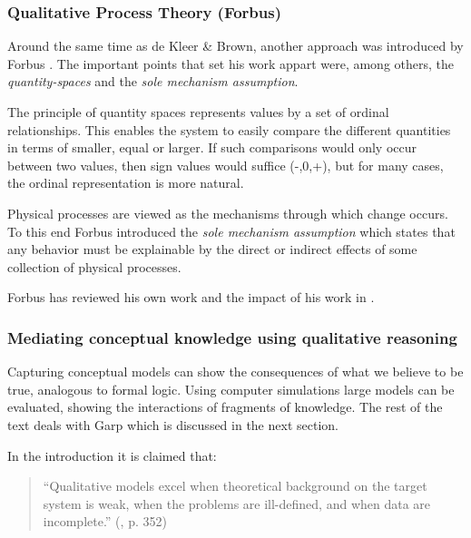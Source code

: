 \documentclass{article} %
\begin{document}
\subsubsection{Qualitative Process Theory (Forbus)}

Around the same time as de Kleer \& Brown, another approach was introduced by
Forbus \cite{forbus}. The important points that set his work appart were,
among others, the \emph{quantity-spaces} and the \emph{sole mechanism
assumption}.

The principle of quantity spaces represents values by a set of ordinal
relationships. This enables the system to easily compare the different
quantities in terms of smaller, equal or larger. If such comparisons would
only occur between two values, then sign values would suffice (-,0,+), but for
many cases, the ordinal representation is more natural.

\vspace{0.8em}

Physical processes are viewed as the mechanisms through which change occurs.
To this end Forbus introduced the \emph{sole mechanism assumption} which
states that any behavior must be explainable by the direct or indirect effects
of some collection of physical processes.

\vspace{0.8em}

Forbus has reviewed his own work and the impact of his work in
\cite{forbus12}.

\subsubsection{Mediating conceptual knowledge using qualitative reasoning}

Capturing conceptual models can show the consequences of what we believe to be
true, analogous to formal logic. Using computer simulations large models can
be evaluated, showing the interactions of fragments of knowledge. The rest
of the text\cite{bredeweg-eco} deals with Garp which is discussed in the next
section.

In the introduction it is claimed that:

	\begin{quote}
	``Qualitative models excel when theoretical background on the target
	system is weak, when the problems are ill-defined, and when data are
	incomplete.'' (\cite{bredeweg-eco}, p. 352)
	\end{quote}
\end{document}
